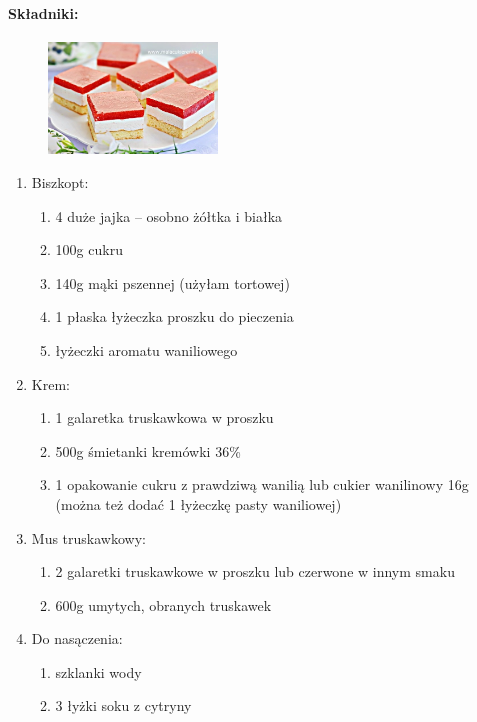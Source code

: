 \documentclass{article}
\begin{document}
    \paragraph{Składniki:}
    \begin{figure}
        \includegraphics[width=0.4\textwidth]{biszkopt_z_musem.jpg}
    \end{figure}
    \begin{enumerate}
        \item Biszkopt:
        \begin{enumerate}
            \item 4 duże jajka – osobno żółtka i białka
            \item 100g cukru
            \item 140g mąki pszennej (użyłam tortowej)
            \item 1 płaska łyżeczka proszku do pieczenia
            \item {} łyżeczki aromatu waniliowego
        \end{enumerate}
        \item Krem:
        \begin{enumerate}
            \item 1 galaretka truskawkowa w proszku
            \item 500g śmietanki kremówki 36\%
            \item 1 opakowanie cukru z prawdziwą wanilią lub cukier wanilinowy
                16g (można też dodać 1 łyżeczkę pasty waniliowej)
        \end{enumerate}
        \item Mus truskawkowy:
        \begin{enumerate}
            \item 2 galaretki truskawkowe w proszku lub czerwone w innym smaku
            \item 600g umytych, obranych truskawek
        \end{enumerate}
        \item Do nasączenia:
        \begin{enumerate}
            \item {} szklanki wody
            \item 3 łyżki soku z cytryny
        \end{enumerate}
    \end{enumerate}
\end{document}
